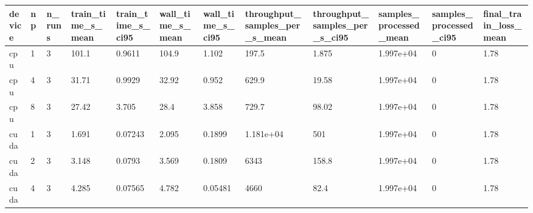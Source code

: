 \begin{tabular}{llllllllllll}
\hline
device & np & n\_runs & train\_time\_s\_mean & train\_time\_s\_ci95 & wall\_time\_s\_mean & wall\_time\_s\_ci95 & throughput\_samples\_per\_s\_mean & throughput\_samples\_per\_s\_ci95 & samples\_processed\_mean & samples\_processed\_ci95 & final\_train\_loss\_mean \\
\hline
cpu & 1 & 3 & 101.1 & 0.9611 & 104.9 & 1.102 & 197.5 & 1.875 & 1.997e+04 & 0 & 1.78 \\
cpu & 4 & 3 & 31.71 & 0.9929 & 32.92 & 0.952 & 629.9 & 19.58 & 1.997e+04 & 0 & 1.78 \\
cpu & 8 & 3 & 27.42 & 3.705 & 28.4 & 3.858 & 729.7 & 98.02 & 1.997e+04 & 0 & 1.78 \\
cuda & 1 & 3 & 1.691 & 0.07243 & 2.095 & 0.1899 & 1.181e+04 & 501 & 1.997e+04 & 0 & 1.78 \\
cuda & 2 & 3 & 3.148 & 0.0793 & 3.569 & 0.1809 & 6343 & 158.8 & 1.997e+04 & 0 & 1.78 \\
cuda & 4 & 3 & 4.285 & 0.07565 & 4.782 & 0.05481 & 4660 & 82.4 & 1.997e+04 & 0 & 1.78 \\
\hline
\end{tabular}
